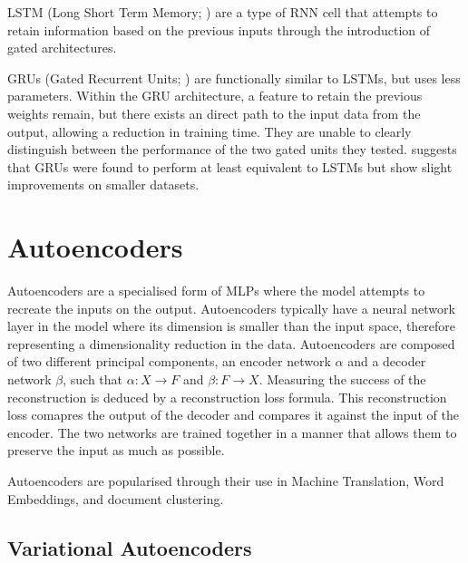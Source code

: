\documentclass[12pt,twoside]{report}
\begin{document}
LSTM (Long Short Term Memory; \cite{hochreiter_long_1997}) are a type of RNN cell that attempts to retain information based on the previous inputs through the introduction of gated architectures. 

GRUs (Gated Recurrent Units; \cite{cho_properties_2014}) are functionally similar to LSTMs, but uses less parameters. Within the GRU architecture, a feature to retain the previous weights remain, but there exists an direct path to the input data from the output, allowing a reduction in training time. They are unable to clearly distinguish between the performance of the two gated units they tested. \cite{chung_empirical_2014} suggests that GRUs were found to perform at least equivalent to LSTMs but show slight improvements on smaller datasets. 

\section{Autoencoders}

Autoencoders are a specialised form of MLPs where the model attempts to recreate the inputs on the output. Autoencoders typically have a neural network layer in the model where its dimension is smaller than the input space, therefore representing a dimensionality reduction in the data. Autoencoders are composed of two different principal components, an encoder network $\alpha$ and a decoder network $\beta$, such that $\alpha : X \rightarrow F$ and $\beta : F \rightarrow X$. Measuring the success of the reconstruction is deduced by a reconstruction loss formula. This reconstruction loss comapres the output of the decoder and compares it against the input of the encoder. The two networks are trained together in a manner that allows them to preserve the input as much as possible.

Autoencoders are popularised through their use in Machine Translation, Word Embeddings, and document clustering.

\subsection{Variational Autoencoders}
\end{document}
